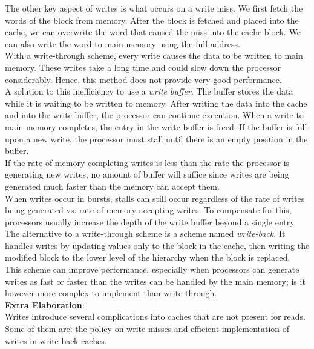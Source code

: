 \documentclass[12pt]{article}
\theoremstyle{definition}
\begin{document}
  The other key aspect of writes is what occurs on a write miss.
  We first fetch the words of the block from memory.
  After the block is fetched and placed into the cache, we can overwrite the word that caused the miss into the cache block.
  We can also write the word to main memory using the full address. \\

  With a write-through scheme, every write causes the data to be written to main memory.
  These writes take a long time and could slow down the processor considerably.
  Hence, this method does not provide very good performance. \\

  A solution to this inefficiency to use a \emph{write buffer}.
  The buffer stores the data while it is waiting to be written to memory.
  After writing the data into the cache and into the write buffer, the processor can continue execution.
  When a write to main memory completes, the entry in the write buffer is freed.
  If the buffer is full upon a new write, the processor must stall until there is an empty position in the buffer. \\
  If the rate of memory completing writes is less than the rate the processor is generating new writes, no amount of buffer will suffice since writes are being generated much faster than the memory can accept them. \\

  When writes occur in bursts, stalls can still occur regardless of the rate of writes being generated vs. rate of memory accepting writes.
  To compensate for this, processors usually increase the depth of the write buffer beyond a single entry. \\

  The alternative to a write-through scheme is a scheme named \emph{write-back}.
  It handles writes by updating values only to the block in the cache, then writing the modified block to the lower level of the hierarchy when the block is replaced. \\
  This scheme can improve performance, especially when processors can generate writes as fast or faster than the writes can be handled by the main memory;
  is it however more complex to implement than write-through. \\

  \textbf{Extra Elaboration}: \\
  Writes introduce several complications into caches that are not present for reads.
  Some of them are: the policy on write misses and efficient implementation of writes in write-back caches. \\
\end{document}
